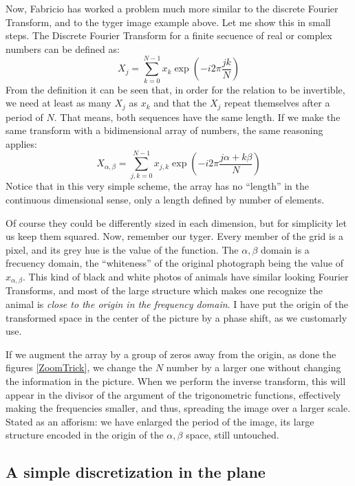 \documentclass[a4paper,12pt]{article}
\begin{document}
Now, Fabricio has worked a problem much more similar to the discrete Fourier Transform, and to
the tyger image example above. 
Let me show this in small steps.
The Discrete Fourier Transform for a finite secuence of real or complex numbers
can be defined as:
\begin{equation}
X_j=\sum_{k=0}^{N-1}x_k \exp(-i 2\pi \frac{j k}{N})
\end{equation}
From the definition it can be seen that, in order for the
relation to be invertible, we need at least as many $X_j$ as
$x_k$ and that the $X_j$ repeat themselves after a period of $N$. That means,
both sequences have the same length. 
If we make the same transform with a bidimensional array of numbers, the same
reasoning applies:
\begin{equation}
X_{\alpha, \beta}=\sum_{j,k=0}^{N-1}x_{j,k} \exp(-i 2\pi \frac{j \alpha + k\beta}{N})
\end{equation}
Notice that in this very simple scheme, the array has no ``length'' in the continuous
dimensional sense, only a length defined by number of elements. 

Of course they could be differently sized in each dimension, but for simplicity let
us keep them squared. Now, remember our tyger. Every member of the grid is a pixel,
and its grey hue is the value of the function. The $\alpha, \beta$ domain
is a frecuency domain, the ``whiteness'' of the original photograph
being the value of $x_{\alpha, \beta}$. 
This kind of black and white photos of animals have
similar looking Fourier Transforms, and most of the large structure
which makes one recognize the animal is 
\emph{close to the origin in the frequency domain}. I have put the
origin of the transformed space in the center of the picture by a phase
shift, as we customarly
use. 

If we augment the array by a group of zeros away from the origin, as done the figures
\ref{ZoomTrick}, we change the $N$ number by a larger one without changing
the information in the picture. When we perform the inverse transform, this will appear
in the divisor of the argument of the trigonometric functions, effectively making the
frequencies smaller, and thus, spreading the image over a larger scale. Stated as an
afforism: we have enlarged the period of the image, its large structure encoded
in the origin of the $\alpha, \beta$ space, still untouched. 

\subsection{A simple discretization in the plane}
\end{document}
